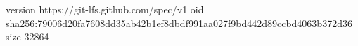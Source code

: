 version https://git-lfs.github.com/spec/v1
oid sha256:79006d20fa7608dd35ab42b1ef8dbdf991aa027f9bd442d89ccbd4063b372d36
size 32864
